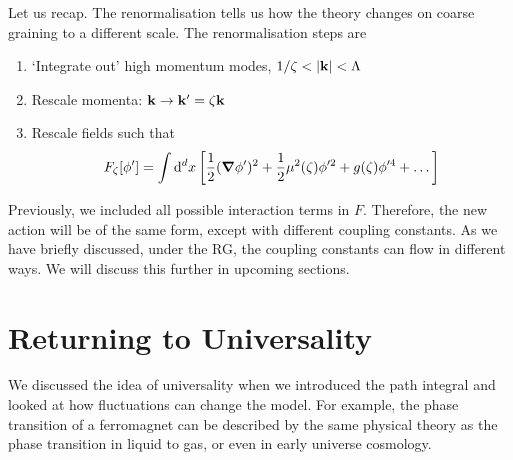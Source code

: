 
Let us recap. The renormalisation tells us how the theory changes on coarse graining to a different scale. The renormalisation steps are
\begin{enumerate}
  \item `Integrate out' high momentum modes, $1/\zeta < \abs{\vb{k}} < \Lambda$
  \item Rescale momenta: $\vb{k} \to \vb{k}' = \zeta \vb{k}$
  \item Rescale fields such that
    \begin{equation}
      F_\zeta [\phi'] = \int \dd[d]{x} \left[ \frac{1}{2} (\grad \phi')^2 + \frac{1}{2} \mu^2(\zeta) \phi'^2 + g(\zeta) \phi'^4 + \dots \right]
    \end{equation}
\end{enumerate}

Previously, we included all possible interaction terms in $F$. Therefore, the new action will be of the same form, except with different coupling constants. As we have briefly discussed, under the RG, the coupling constants can flow in different ways. We will discuss this further in upcoming sections.

\section{Returning to Universality}%
\label{sec:universality}

We discussed the idea of universality when we introduced the path integral and looked at how fluctuations can change the model.
For example, the phase transition of a ferromagnet can be described by the same physical theory as the phase transition in liquid to gas, or even in early universe cosmology.

